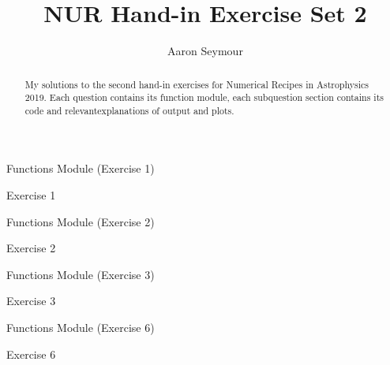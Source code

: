 \documentclass[a4paper,10pt]{article}
\title{NUR Hand-in Exercise Set 2}
\author{Aaron Seymour}
\begin{document}
\maketitle

\begin{abstract}
 My solutions to the second hand-in exercises for Numerical Recipes in Astrophysics 2019. Each question contains its function module, each subquestion section contains its code and relevantexplanations of output and plots.
\end{abstract}


\begin{section}{Functions Module (Exercise 1)}

\end{section}


\begin{section}{Exercise 1}

\end{section}

\FloatBarrier
\begin{section}{Functions Module (Exercise 2)}

\end{section}


\begin{section}{Exercise 2}

\end{section}


\FloatBarrier
\begin{section}{Functions Module (Exercise 3)}

\end{section}

\begin{section}{Exercise 3}

\end{section}


\FloatBarrier
\begin{section}{Functions Module (Exercise 6)}

\end{section}

\begin{section}{Exercise 6}

\end{section}
  
\end{document}
